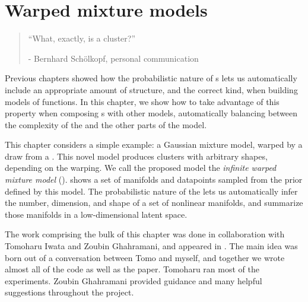 
\inbpdocument

\chapter{Warped mixture models}  %
\label{ch:warped}

\begin{quotation}
``What, exactly, is a cluster?''

\hspace*{\fill} - Bernhard Sch\"{o}lkopf, personal communication
\end{quotation}

Previous chapters showed how the probabilistic nature of \gp{}s lets us automatically include an appropriate amount of structure, and the correct kind, when building models of functions.
In this chapter, we show how to take advantage of this property when composing \gp{}s with other models,
automatically balancing between the complexity of the \gp{} and the other parts of the model.

This chapter considers a simple example: a Gaussian mixture model, warped by a draw from a \gp{}.
This novel model produces clusters with arbitrary shapes, depending on the warping.
We call the proposed model the \emph{infinite warped mixture model} (\iwmm{}).
 shows a set of manifolds and datapoints sampled from the prior defined by this model.
The probabilistic nature of the \iwmm{} lets us automatically infer the number, dimension, and shape of a set of nonlinear manifolds, and summarize those manifolds in a low-dimensional latent space.





The work comprising the bulk of this chapter was done in collaboration with Tomoharu Iwata and Zoubin Ghahramani, and appeared in \citet{IwaDuvGha12}.
The main idea was born out of a conversation between Tomo and myself, and together we wrote almost all of the code as well as the paper.
Tomoharu ran most of the experiments.
Zoubin Ghahramani provided guidance and many helpful suggestions throughout the project.


